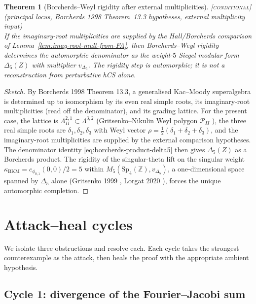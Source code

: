 \documentclass[11pt]{amsart}
\providecommand{\Z}{\mathbb{Z}}
\providecommand{\cP}{\mathcal{P}}
\providecommand{\Sp}{\mathrm{Sp}}
\providecommand{\kBKM}{\kappa_{\mathrm{BKM}}}
\providecommand{\ClaimStatusConditional}{\textsc{[conditional]}}
\theoremstyle{plain}
\newtheorem{theorem}{Theorem}[section]
\theoremstyle{definition}
\theoremstyle{remark}
\begin{document}
\begin{theorem}[Borcherds--Weyl rigidity after external multiplicities]
\label{thm:borcherds-weyl-rigidity-reconstruction}
\ClaimStatusConditional{}\textup{(}principal locus, Borcherds 1998
Theorem~13.3 hypotheses, external multiplicity input\textup{)}\\
If the imaginary-root multiplicities are supplied by the
Hall/Borcherds comparison of Lemma~\ref{lem:imag-root-mult-from-FA},
then Borcherds--Weyl rigidity determines the automorphic denominator
as the weight-$5$ Siegel modular form $\Delta_{5}(Z)$ with multiplier
$v_{\Delta_{5}}$. The rigidity step is automorphic; it is not a
reconstruction from perturbative hCS alone.
\end{theorem}

\begin{proof}[Sketch]
By Borcherds 1998 \cite{Borcherds1998} Theorem 13.3, a generalised
Kac--Moody superalgebra is determined up to isomorphism by its even
real simple roots, its imaginary-root multiplicities (read off the
denominator), and its grading lattice. For the present case, the lattice
is $\Lambda^{2,1}_{II}\subset\Lambda^{3,2}$ (Gritsenko--Nikulin Weyl
polygon $\cP_{II}$ \cite{GritsenkoNikulin1995}), the three real simple
roots are $\delta_{1},\delta_{2},\delta_{3}$ with Weyl vector
$\rho=\tfrac{1}{2}(\delta_{1}+\delta_{2}+\delta_{3})$, and the
imaginary-root multiplicities are supplied by the external comparison
hypotheses. The denominator identity
\eqref{eq:borcherds-product-delta5} then gives $\Delta_{5}(Z)$ as a
Borcherds product. The rigidity of the singular-theta lift on
the singular weight $\kBKM=c_{\phi_{0,1}}(0,0)/2=5$ within
$M_{5}(\Sp_{4}(\Z),v_{\Delta_{5}})$, a one-dimensional space spanned by
$\Delta_{5}$ alone (Gritsenko 1999 \cite{GritsenkoNikulin1995}, Lorgat
2020 \cite{Lorgat2020}), forces the unique automorphic completion.
\end{proof}

\section{Attack--heal cycles}
\label{sec:attack-heal-cycles}

We isolate three obstructions and resolve each. Each cycle takes the
strongest counterexample as the attack, then heals the proof with the
appropriate ambient hypothesis.

\subsection{Cycle 1: divergence of the Fourier--Jacobi sum}
\end{document}
